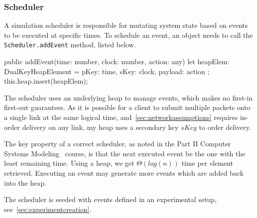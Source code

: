 \documentclass[12pt,a4paper,twoside,openright]{report}
\begin{document}
		
		\subsubsection{Scheduler}
	
		A simulation scheduler is responsible for mutating system state based on events to be executed at specific times. To schedule an event, an object needs to call the \texttt{Scheduler.addEvent} method, listed below.
\begin{typescript}
public addEvent(time: number, clock: number, action: any) {
 let heapElem: DualKeyHeapElement = {
     pKey: time,
     sKey: clock,
     payload: action
 };
 this.heap.insert(heapElem);
}
\end{typescript}

		The scheduler uses an underlying heap to manage events, which makes no first-in first-out guarantees. As it is possible for a client to submit multiple packets onto a single link at the same logical time, and~\cref{sec:networkassumptions} requires in-order delivery on any link, my heap uses a secondary key $sKey$ to order delivery.
		
		The key property of a correct scheduler, as noted in the Part II Computer Systems Modeling~\cite[slide 120]{compsysmodeling} course, is that the next executed event be the one with the least remaining time. Using a heap, we get $\Theta (log(n))$ time per element retrieved. Executing an event may generate more events which are added back into the heap.
		
		The scheduler is seeded with events defined in an experimental setup, see~\cref{sec:experimentcreation}.
		
\end{document}

